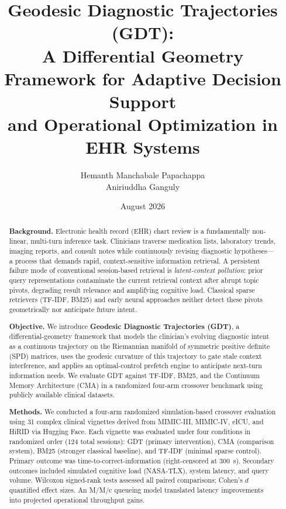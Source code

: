 \documentclass[11pt]{article}
\title{Geodesic Diagnostic Trajectories (GDT):\\
A Differential Geometry Framework for Adaptive Decision Support\\
and Operational Optimization in EHR Systems}
\author{
Hemanth Manchabale Papachappa \\
Aniriuddha Ganguly
}
\date{August 2026}
\begin{document}
\maketitle

\begin{abstract}
\textbf{Background.} Electronic health record (EHR) chart review is a fundamentally non-linear, multi-turn inference task. Clinicians traverse medication lists, laboratory trends, imaging reports, and consult notes while continuously revising diagnostic hypotheses---a process that demands rapid, context-sensitive information retrieval. A persistent failure mode of conventional session-based retrieval is \emph{latent-context pollution}: prior query representations contaminate the current retrieval context after abrupt topic pivots, degrading result relevance and amplifying cognitive load. Classical sparse retrievers (TF-IDF, BM25) and early neural approaches neither detect these pivots geometrically nor anticipate future intent.

\textbf{Objective.} We introduce \textbf{Geodesic Diagnostic Trajectories (GDT)}, a differential-geometry framework that models the clinician's evolving diagnostic intent as a continuous trajectory on the Riemannian manifold of symmetric positive definite (SPD) matrices, uses the geodesic curvature of this trajectory to gate stale context interference, and applies an optimal-control prefetch engine to anticipate next-turn information needs. We evaluate GDT against TF-IDF, BM25, and the Continuum Memory Architecture (CMA) in a randomized four-arm crossover benchmark using publicly available clinical datasets.

\textbf{Methods.} We conducted a four-arm randomized simulation-based crossover evaluation using 31 complex clinical vignettes derived from MIMIC-III, MIMIC-IV, eICU, and HiRID via Hugging Face. Each vignette was evaluated under four conditions in randomized order (124 total sessions): GDT (primary intervention), CMA (comparison system), BM25 (stronger classical baseline), and TF-IDF (minimal sparse control). Primary outcome was time-to-correct-information (right-censored at 300~s). Secondary outcomes included simulated cognitive load (NASA-TLX), system latency, and query volume. Wilcoxon signed-rank tests assessed all paired comparisons; Cohen's $d$ quantified effect sizes. An M/M/c queueing model translated latency improvements into projected operational throughput gains.


\end{abstract}
\end{document}
